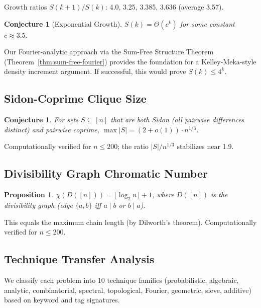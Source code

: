 \documentclass[11pt,a4paper]{article}
\newtheorem{proposition}[theorem]{Proposition}
\newtheorem{conjecture}[theorem]{Conjecture}
\theoremstyle{definition}
\theoremstyle{remark}
\begin{document}
Growth ratios $S(k+1)/S(k)$: 4.0, 3.25, 3.385, 3.636 (average 3.57).

\begin{conjecture}[Exponential Growth]
$S(k) = \Theta(c^k)$ for some constant $c \approx 3.5$.
\end{conjecture}

Our Fourier-analytic approach via the Sum-Free Structure Theorem
(Theorem~\ref{thm:sum-free-fourier}) provides the foundation for a
Kelley-Meka-style density increment argument. If successful, this would
prove $S(k) \leq 4^k$.

\subsection{Sidon-Coprime Clique Size}

\begin{conjecture}
For sets $S \subseteq [n]$ that are both Sidon (all pairwise differences
distinct) and pairwise coprime, $\max |S| = (2 + o(1)) \cdot n^{1/3}$.
\end{conjecture}

Computationally verified for $n \leq 200$; the ratio $|S|/n^{1/3}$ stabilizes
near 1.9.

\subsection{Divisibility Graph Chromatic Number}

\begin{proposition}
$\chi(D([n])) = \lfloor \log_2 n \rfloor + 1$, where $D([n])$ is the
divisibility graph (edge $\{a,b\}$ iff $a \mid b$ or $b \mid a$).
\end{proposition}

This equals the maximum chain length (by Dilworth's theorem).
Computationally verified for $n \leq 200$.

\subsection{Technique Transfer Analysis}

We classify each problem into 10 technique families (probabilistic, algebraic,
analytic, combinatorial, spectral, topological, Fourier, geometric, sieve,
additive) based on keyword and tag signatures.
\end{document}
